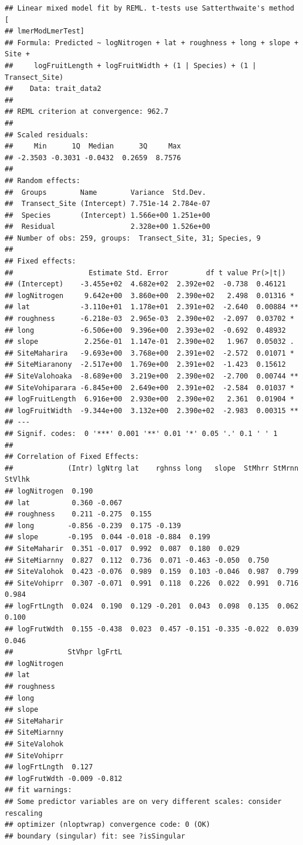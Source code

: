 \documentclass[
  12pt,
]{article}
\begin{document}
\begin{verbatim}
## Linear mixed model fit by REML. t-tests use Satterthwaite's method [
## lmerModLmerTest]
## Formula: Predicted ~ logNitrogen + lat + roughness + long + slope + Site +  
##     logFruitLength + logFruitWidth + (1 | Species) + (1 | Transect_Site)
##    Data: trait_data2
## 
## REML criterion at convergence: 962.7
## 
## Scaled residuals: 
##     Min      1Q  Median      3Q     Max 
## -2.3503 -0.3031 -0.0432  0.2659  8.7576 
## 
## Random effects:
##  Groups        Name        Variance  Std.Dev. 
##  Transect_Site (Intercept) 7.751e-14 2.784e-07
##  Species       (Intercept) 1.566e+00 1.251e+00
##  Residual                  2.328e+00 1.526e+00
## Number of obs: 259, groups:  Transect_Site, 31; Species, 9
## 
## Fixed effects:
##                  Estimate Std. Error         df t value Pr(>|t|)   
## (Intercept)    -3.455e+02  4.682e+02  2.392e+02  -0.738  0.46121   
## logNitrogen     9.642e+00  3.860e+00  2.390e+02   2.498  0.01316 * 
## lat            -3.110e+01  1.178e+01  2.391e+02  -2.640  0.00884 **
## roughness      -6.218e-03  2.965e-03  2.390e+02  -2.097  0.03702 * 
## long           -6.506e+00  9.396e+00  2.393e+02  -0.692  0.48932   
## slope           2.256e-01  1.147e-01  2.390e+02   1.967  0.05032 . 
## SiteMaharira   -9.693e+00  3.768e+00  2.391e+02  -2.572  0.01071 * 
## SiteMiaranony  -2.517e+00  1.769e+00  2.391e+02  -1.423  0.15612   
## SiteValohoaka  -8.689e+00  3.219e+00  2.390e+02  -2.700  0.00744 **
## SiteVohiparara -6.845e+00  2.649e+00  2.391e+02  -2.584  0.01037 * 
## logFruitLength  6.916e+00  2.930e+00  2.390e+02   2.361  0.01904 * 
## logFruitWidth  -9.344e+00  3.132e+00  2.390e+02  -2.983  0.00315 **
## ---
## Signif. codes:  0 '***' 0.001 '**' 0.01 '*' 0.05 '.' 0.1 ' ' 1
## 
## Correlation of Fixed Effects:
##             (Intr) lgNtrg lat    rghnss long   slope  StMhrr StMrnn StVlhk
## logNitrogen  0.190                                                        
## lat          0.360 -0.067                                                 
## roughness    0.211 -0.275  0.155                                          
## long        -0.856 -0.239  0.175 -0.139                                   
## slope       -0.195  0.044 -0.018 -0.884  0.199                            
## SiteMaharir  0.351 -0.017  0.992  0.087  0.180  0.029                     
## SiteMiarnny  0.827  0.112  0.736  0.071 -0.463 -0.050  0.750              
## SiteValohok  0.423 -0.076  0.989  0.159  0.103 -0.046  0.987  0.799       
## SiteVohiprr  0.307 -0.071  0.991  0.118  0.226  0.022  0.991  0.716  0.984
## logFrtLngth  0.024  0.190  0.129 -0.201  0.043  0.098  0.135  0.062  0.100
## logFrutWdth  0.155 -0.438  0.023  0.457 -0.151 -0.335 -0.022  0.039  0.046
##             StVhpr lgFrtL
## logNitrogen              
## lat                      
## roughness                
## long                     
## slope                    
## SiteMaharir              
## SiteMiarnny              
## SiteValohok              
## SiteVohiprr              
## logFrtLngth  0.127       
## logFrutWdth -0.009 -0.812
## fit warnings:
## Some predictor variables are on very different scales: consider rescaling
## optimizer (nloptwrap) convergence code: 0 (OK)
## boundary (singular) fit: see ?isSingular
\end{verbatim}
\end{document}
